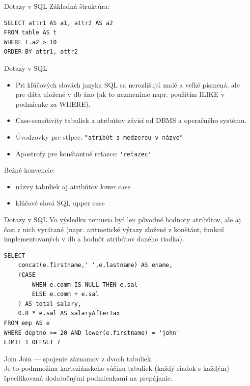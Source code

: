 \documentclass[12pt]{beamer}
\begin{document}
\begin{frame}[fragile]{Dotazy v SQL}
Základná štruktúra:
\begin{verbatim}
SELECT attr1 AS a1, attr2 AS a2
FROM table AS t
WHERE t.a2 > 10
ORDER BY attr1, attr2
\end{verbatim}
\end{frame}

\begin{frame}[fragile]{Dotazy v SQL}
\begin{itemize}
\item Pri kľúčových slovách jazyka SQL sa nerozlišujú malé a veľké písmená,
ale pre dáta uložené v db áno (ak to nezmeníme napr. použitím ILIKE v podmienke za WHERE).
\item Case-sensitivity tabuliek a atribútov závisí od DBMS a operačného systému.
\item Úvodzovky pre stĺpce: \verb|"atribút s medzerou v názve"|
\item Apostrofy pre konštantné reťazce: \verb|'reťazec'|
\end{itemize}

Bežné konvencie:
\begin{itemize}
\item názvy tabuliek aj atribútov lower case
\item kľúčové slová SQL upper case
\end{itemize}
\end{frame}

\begin{frame}[fragile]{Dotazy v SQL}
Vo výsledku nemusia byť len pôvodné hodnoty atribútov, ale aj čosi z nich vyrátané (napr. aritmetické výrazy zložené z konštánt, funkcií implementovaných v db a hodnôt atribútov daného riadka).\\[3mm]

\begin{verbatim}
SELECT
    concat(e.firstname,' ',e.lastname) AS ename,
    (CASE
        WHEN e.comm IS NULL THEN e.sal
        ELSE e.comm + e.sal
    ) AS total_salary,
    0.8 * e.sal AS salaryAfterTax
FROM emp AS e
WHERE deptno >= 20 AND lower(e.firstname) = 'john'
LIMIT 1 OFFSET 7
\end{verbatim}
\end{frame}


\begin{frame}{Join}
\alert{Join} --- spojenie záznamov z dvoch tabuliek.\\[3mm]

Je to podmnožina karteziánskeho súčinu tabuliek (každý riadok s každým)
špecifikovaná dodatočnými podmienkami na prepájanie.
\end{frame}
\end{document}
